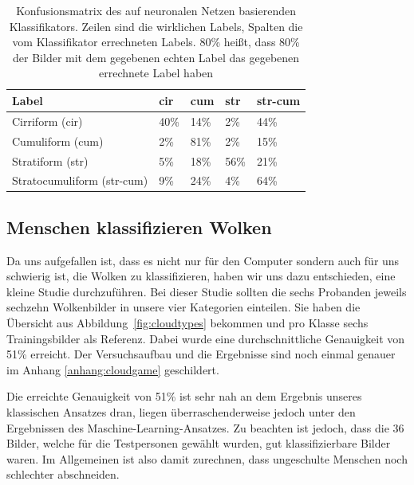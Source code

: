 \documentclass[a4,german]{article}
\begin{document}

\begin{table}
    \begin{tabular}{| l | l | l | l | l |}
        \hline
        Label & cir & cum & str & str-cum \\ \hline
        Cirriform (cir) & 40\% & 14\% & 2\% & 44\% \\ \hline
        Cumuliform (cum) & 2\% & 81\% & 2\% & 15\% \\ \hline
        Stratiform (str) & 5\% & 18\% & 56\% & 21\% \\ \hline
        Stratocumuliform (str-cum) & 9\% & 24\% & 4\% & 64\% \\ \hline
    \end{tabular}
    \caption{Konfusionsmatrix des auf neuronalen Netzen basierenden Klassifikators. Zeilen sind die wirklichen Labels, Spalten die vom Klassifikator errechneten Labels. 80\% heißt, dass 80\% der Bilder mit dem gegebenen echten Label das gegebenen errechnete Label haben}
    \label{tab:confusionNeural}
\end{table}

\subsection{Menschen klassifizieren Wolken}

Da uns aufgefallen ist, dass es nicht nur für den Computer sondern auch für uns schwierig ist, die Wolken zu klassifizieren, haben wir uns dazu entschieden, eine kleine Studie durchzuführen.
Bei dieser Studie sollten die sechs Probanden jeweils sechzehn Wolkenbilder in unsere vier Kategorien einteilen.
Sie haben die Übersicht aus Abbildung~\ref{fig:cloudtypes} bekommen und pro Klasse sechs Trainingsbilder als Referenz.
Dabei wurde eine durchschnittliche Genauigkeit von 51\% erreicht. Der Versuchsaufbau und die Ergebnisse sind noch einmal genauer im Anhang \ref{anhang:cloudgame} geschildert.

Die erreichte Genauigkeit von 51\% ist sehr nah an dem Ergebnis unseres klassischen Ansatzes dran, liegen überraschenderweise jedoch unter den Ergebnissen des Maschine-Learning-Ansatzes.
Zu beachten ist jedoch, dass die 36 Bilder, welche für die Testpersonen gewählt wurden, gut klassifizierbare Bilder waren.
Im Allgemeinen ist also damit zurechnen, dass ungeschulte Menschen noch schlechter abschneiden.
\end{document}
